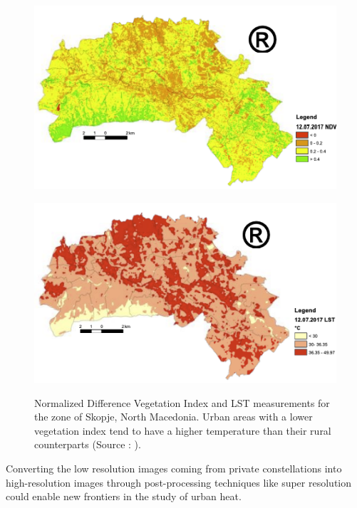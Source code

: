     \begin{figure}[H]
        \centering
        \begin{minipage}{0.75\textwidth}
            \centering
            \includegraphics[width=\textwidth]{Includes/1-skopje-NDVI.png}
            \label{fig:1-skopje-NDVI}
        \end{minipage}\hfill
        \begin{minipage}{0.75\textwidth}
            \centering
            \includegraphics[width=\textwidth]{Includes/1-skopje-LST.png}
            \label{fig:1-skopje-LST}
        \end{minipage}
        \caption{Normalized Difference Vegetation Index \cite{Rouse1973MonitoringVS} and LST measurements for the zone of Skopje, North Macedonia. Urban areas with a lower vegetation index tend to have a higher temperature than their rural counterparts (Source : \cite{skopje2018}).} 
        \label{fig:1-skopie-UHI}
    \end{figure}

    Converting the low resolution images coming from private constellations into high-resolution images through post-processing techniques like super resolution could enable new frontiers in the study of urban heat. 

